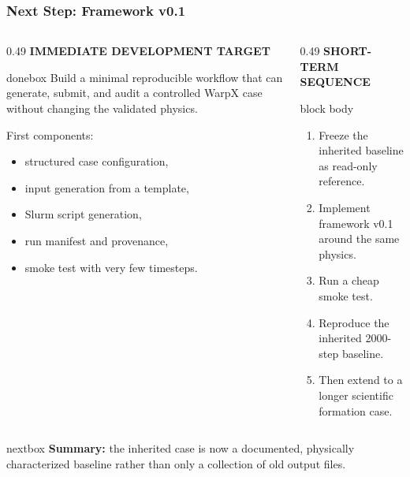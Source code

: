 \documentclass[aspectratio=169,11pt]{beamer}
\newcommand{\smallcapslabel}[1]{%
    {\scriptsize\bfseries\color{myblue}\MakeUppercase{#1}}%
}
\begin{document}
\begin{frame}
\frametitle{Next Step: Framework v0.1}

\begin{columns}[T,totalwidth=\textwidth]
    \begin{column}{0.49\textwidth}
        \smallcapslabel{Immediate development target}
        \vspace{0.08cm}
        \begin{beamercolorbox}[wd=\linewidth,rounded=true,sep=0.60em]{donebox}
        \small
        Build a minimal reproducible workflow that can generate, submit, and audit a controlled WarpX case without changing the validated physics.
        \end{beamercolorbox}

        \vspace{0.15cm}
        \small
        First components:
        \begin{itemize}\setlength\itemsep{0.11cm}
            \item structured case configuration,
            \item input generation from a template,
            \item Slurm script generation,
            \item run manifest and provenance,
            \item smoke test with very few timesteps.
        \end{itemize}
    \end{column}

    \begin{column}{0.49\textwidth}
        \smallcapslabel{Short-term sequence}
        \vspace{0.08cm}
        \begin{beamercolorbox}[wd=\linewidth,rounded=true,sep=0.65em]{block body}
        \small
        \begin{enumerate}\setlength\itemsep{0.14cm}
            \item Freeze the inherited baseline as read-only reference.
            \item Implement framework v0.1 around the same physics.
            \item Run a cheap smoke test.
            \item Reproduce the inherited 2000-step baseline.
            \item Then extend to a longer scientific formation case.
        \end{enumerate}
        \end{beamercolorbox}
    \end{column}
\end{columns}

\vspace{0.12cm}
\begin{beamercolorbox}[wd=\textwidth,rounded=true,sep=0.44em]{nextbox}
{\scriptsize\textbf{Summary:} the inherited case is now a documented, physically characterized baseline rather than only a collection of old output files.}
\end{beamercolorbox}

\end{frame}
\end{document}
